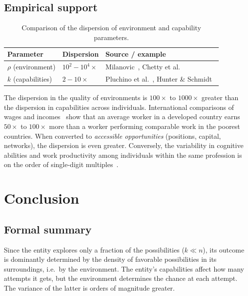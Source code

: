\documentclass[12pt,a4paper]{article}
\begin{document}
\subsection{Empirical support}

\begin{table}[h]
\centering
\begin{tabular}{@{}lll@{}}
\toprule
\textbf{Parameter} & \textbf{Dispersion} & \textbf{Source / example} \\
\midrule
$\rho$ (environment) & $10^2 - 10^4 \times$ & Milanovic~\cite{milanovic2015}, Chetty et al.~\cite{chetty2014} \\
$k$ (capabilities)   & $2 - 10 \times$      & Pluchino et al.~\cite{pluchino2018}, Hunter \& Schmidt~\cite{hunter1998} \\
\bottomrule
\end{tabular}
\caption{Comparison of the dispersion of environment and capability parameters.}
\label{tab:rozptyl}
\end{table}

The dispersion in the quality of environments is $100\times$ to $1000\times$ greater than the dispersion in capabilities across individuals. International comparisons of wages and incomes~\cite{milanovic2015} show that an average worker in a developed country earns $50\times$ to $100\times$ more than a worker performing comparable work in the poorest countries. When converted to \emph{accessible opportunities} (positions, capital, networks), the dispersion is even greater. Conversely, the variability in cognitive abilities and work productivity among individuals within the same profession is on the order of single-digit multiples~\cite{hunter1998}.

\section{Conclusion}

\subsection{Formal summary}

Since the entity explores only a fraction of the possibilities ($k \ll n$), its outcome is dominantly determined by the density of favorable possibilities in its surroundings, i.e.\ by the environment. The entity's capabilities affect how many attempts it gets, but the environment determines the chance at each attempt. The variance of the latter is orders of magnitude greater.
\end{document}
